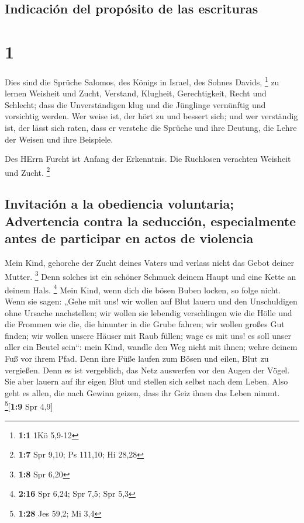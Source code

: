 \hypertarget{indicaciuxf3n-del-propuxf3sito-de-las-escrituras}{%
\subsection{Indicación del propósito de las
escrituras}\label{indicaciuxf3n-del-propuxf3sito-de-las-escrituras}}

\hypertarget{section}{%
\section{1}\label{section}}

 Dies sind die Sprüche Salomos, des Königs in Israel, des
Sohnes Davids, \footnote{\textbf{1:1} 1Kö 5,9-12}  zu
lernen Weisheit und Zucht, Verstand,  Klugheit,
Gerechtigkeit, Recht und Schlecht;  dass die
Unverständigen klug und die Jünglinge vernünftig und vorsichtig werden.
 Wer weise ist, der hört zu und bessert sich; und wer
verständig ist, der lässt sich raten,  dass er verstehe
die Sprüche und ihre Deutung, die Lehre der Weisen und ihre Beispiele.

 Des HErrn Furcht ist Anfang der Erkenntnis. Die Ruchlosen
verachten Weisheit und Zucht. \footnote{\textbf{1:7} Spr 9,10; Ps
  111,10; Hi 28,28}

\hypertarget{invitaciuxf3n-a-la-obediencia-voluntaria-advertencia-contra-la-seducciuxf3n-especialmente-antes-de-participar-en-actos-de-violencia}{%
\subsection{Invitación a la obediencia voluntaria; Advertencia contra la
seducción, especialmente antes de participar en actos de
violencia}\label{invitaciuxf3n-a-la-obediencia-voluntaria-advertencia-contra-la-seducciuxf3n-especialmente-antes-de-participar-en-actos-de-violencia}}

 Mein Kind, gehorche der Zucht deines Vaters und verlass
nicht das Gebot deiner Mutter. \footnote{\textbf{1:8} Spr 6,20}
 Denn solches ist ein schöner Schmuck deinem Haupt und
eine Kette an deinem Hals. \footnote{\textbf{2:16} Spr 6,24; Spr 7,5;
  Spr 5,3}  Mein Kind, wenn dich die bösen Buben locken,
so folge nicht.  Wenn sie sagen: „Gehe mit uns! wir
wollen auf Blut lauern und den Unschuldigen ohne Ursache nachstellen;
 wir wollen sie lebendig verschlingen wie die Hölle und
die Frommen wie die, die hinunter in die Grube fahren; 
wir wollen großes Gut finden; wir wollen unsere Häuser mit Raub füllen;
 wage es mit uns! es soll unser aller ein Beutel sein``:
 mein Kind, wandle den Weg nicht mit ihnen; wehre deinem
Fuß vor ihrem Pfad.  Denn ihre Füße laufen zum Bösen und
eilen, Blut zu vergießen.  Denn es ist vergeblich, das
Netz auswerfen vor den Augen der Vögel.  Sie aber lauern
auf ihr eigen Blut und stellen sich selbst nach dem Leben.
 Also geht es allen, die nach Gewinn geizen, dass ihr
Geiz ihnen das Leben nimmt. \footnote{\textbf{1:28} Jes 59,2; Mi 3,4}{[}\textbf{1:9}
Spr 4,9{]}

